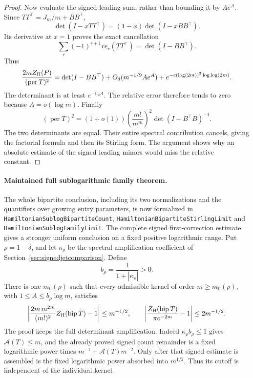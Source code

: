 \begin{proof}
Now evaluate the signed leading sum, rather than bounding
it by \(Ae^A\).
Since \(TT^\top=J_m/m+BB^\top\),
\[
 \det(I-xTT^\top)=(1-x)\det(I-xBB^\top).
\]
Its derivative at \(x=1\) proves the exact cancellation
\[
 \sum_r(-1)^{r+1}r e_r(TT^\top)=\det(I-BB^\top).
\]
Thus
\[
 \frac{2m Z_{\rm H}(P)}{(\operatorname{per}T)^2}
 =\det(I-BB^\top)
      +O_\delta(m^{-1/9}Ae^A)
      +e^{-c(\log(2m))^3\log\log(2m)}.
\]
The determinant is at least \(e^{-C_\delta A}\).
The relative error therefore tends to zero because
\(A=o(\log m)\).
Finally
\[
 (\operatorname{per}T)^2
  =(1+o(1))\left(\frac{m!}{m^m}\right)^2
                               \det(I-B^\top B)^{-1}.
\]
The two determinants are equal.
Their entire spectral contribution cancels, giving the
factorial formula and then its Stirling form.
The argument shows why an absolute estimate of the signed
leading minors would miss the relative constant.
\end{proof}

\paragraph{Maintained full sublogarithmic family theorem.}
The whole bipartite conclusion, including its two normalizations
and the quantifiers over growing entry parameters, is now
formalized in \texttt{HamiltonianSublogBipartiteCount},
\texttt{HamiltonianBipartiteStirlingLimit} and
\texttt{HamiltonianSublogFamilyLimit}.
The complete signed first-correction estimate gives a stronger
uniform conclusion on a fixed positive logarithmic range.
Put \(\rho=1-\delta\), and let \(\kappa_\rho\) be the spectral
amplification coefficient of Section~\ref{sec:signedjetcomparison}.
Define
\[
 b_\rho=\frac1{1+|\kappa_\rho|}>0 .
\]
There is one \(m_0(\rho)\) such that every admissible kernel
of order \(m\geq m_0(\rho)\), with
\(1\leq A\leq b_\rho\log m\), satisfies
\[
 \left|\frac{2m\,m^{2m}}{(m!)^2}Z_{\rm H}(\operatorname{bip}T)-1\right|
       \leq m^{-1/2},\qquad
 \left|\frac{Z_{\rm H}(\operatorname{bip}T)}
                  {\pi e^{-2m}}-1\right|\leq2m^{-1/2}.
\]
The proof keeps the full determinant amplification.
Indeed \(\kappa_\rho b_\rho\leq1\) gives
\(\mathcal A(T)\leq m\), and the already proved signed
count remainder is a fixed logarithmic power times
\(m^{-1}+\mathcal A(T)m^{-2}\).
Only after that signed estimate is assembled is the fixed
logarithmic power absorbed into \(m^{1/2}\).
Thus its cutoff is independent of the individual kernel.

